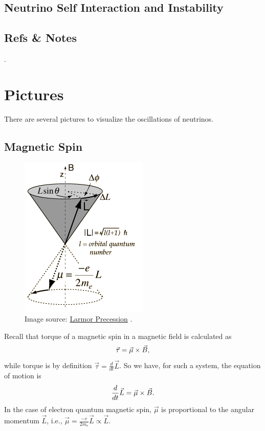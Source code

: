 \documentclass[letterpaper,12pt,english]{sphinxmanual}
\begin{document}
\section{Neutrino Self Interaction and Instability}
\label{instability:neutrino-self-interaction-and-instability}

\section{Refs \& Notes}
\label{instability:refs-notes}
.


\chapter{Pictures}
\label{picture:pictures}\label{picture::doc}
There are several pictures to visualize the oscillations of neutrinos.


\section{Magnetic Spin}
\label{picture:magnetic-spin}\begin{figure}[htbp]
\centering
\capstart

\includegraphics{larmor.png}
\caption{Image source: \href{http://hyperphysics.phy-astr.gsu.edu/hbase/magnetic/larmor.html}{Larmor Precession} .}\end{figure}

Recall that torque of a magnetic spin in a magnetic field is calculated as
\begin{gather}
\begin{split}\vec \tau = \vec \mu \times \vec B,\end{split}\notag
\end{gather}
while torque is by definition \(\vec \tau = \frac{d}{dt}\vec L\). So we have, for such a system, the equation of motion is
\begin{gather}
\begin{split}\frac{d}{dt}\vec L = \vec \mu \times \vec B.\end{split}\notag
\end{gather}
In the case of electron quantum magnetic spin, \(\vec \mu\) is proportional to the angular momentum \(\vec L\), i.e., \(\vec \mu = \frac{-e}{2m_e}\vec L\propto \vec L\).
\end{document}
